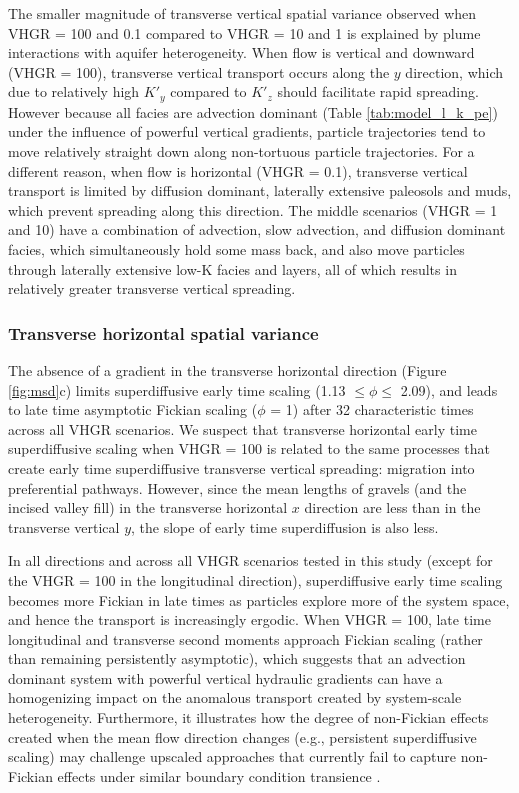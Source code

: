 The smaller magnitude of transverse vertical spatial variance observed when VHGR = 100 and 0.1 compared to VHGR = 10 and 1 is explained by plume interactions with aquifer heterogeneity. When flow is vertical and downward (VHGR = 100), transverse vertical transport occurs along the $y$ direction, which due to relatively high $K'_y$ compared to $K'_z$ should facilitate rapid spreading. However because all facies are advection dominant (Table \ref{tab:model_l_k_pe}) under the influence of powerful vertical gradients, particle trajectories tend to move relatively straight down along non-tortuous particle trajectories. For a different reason, when flow is horizontal (VHGR = 0.1), transverse vertical transport is limited by diffusion dominant, laterally extensive paleosols and muds, which prevent spreading along this direction. The middle scenarios (VHGR = 1 and 10) have a combination of advection, slow advection, and diffusion dominant facies, which simultaneously hold some mass back, and also move particles through laterally extensive low-K facies and layers, all of which results in relatively greater transverse vertical spreading. 


\subsubsection{Transverse horizontal spatial variance}
\label{ss_3_2c}
The absence of a gradient in the transverse horizontal direction (Figure \ref{fig:msd}c) limits superdiffusive early time scaling (1.13 $\leq \phi \leq$ 2.09), and leads to late time asymptotic Fickian scaling ($\phi$ = 1) after 32 characteristic times across all VHGR scenarios. We suspect that transverse horizontal early time superdiffusive scaling when VHGR = 100 is related to the same processes that create early time superdiffusive transverse vertical spreading: migration into preferential pathways. However, since the mean lengths of gravels (and the incised valley fill) in the transverse horizontal $x$ direction are less than in the transverse vertical $y$, the slope of early time superdiffusion is also less.  

In all directions and across all VHGR scenarios tested in this study (except for the VHGR = 100 in the longitudinal direction), superdiffusive early time scaling becomes more Fickian in late times as particles explore more of the system space, and hence the transport is increasingly ergodic. When VHGR = 100, late time longitudinal and transverse second moments approach Fickian scaling (rather than remaining persistently asymptotic), which suggests that an advection dominant system with powerful vertical hydraulic gradients can have a homogenizing impact on the anomalous transport created by system-scale heterogeneity. Furthermore, it illustrates how the degree of non-Fickian effects created when the mean flow direction changes (e.g., persistent superdiffusive scaling) may challenge upscaled approaches that currently fail to capture non-Fickian effects under similar boundary condition transience \citep{guo2020adaptive}.



